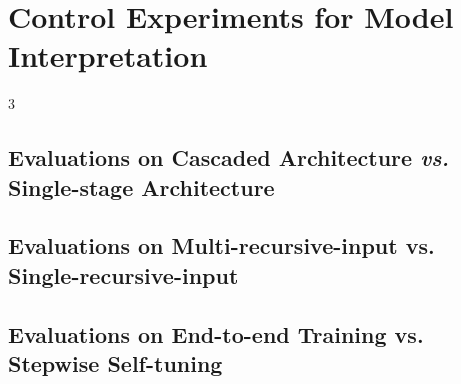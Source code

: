 \documentclass[senior]{IPSstyle}
\begin{document}
\section{Control Experiments for Model Interpretation}3
\subsection{Evaluations on Cascaded Architecture \emph{vs.} Single-stage Architecture}
\subsection{Evaluations on Multi-recursive-input vs. Single-recursive-input}
\subsection{Evaluations on End-to-end Training vs. Stepwise Self-tuning}


\end{document}
